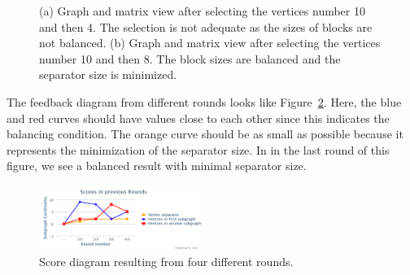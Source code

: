 \documentclass[12pt, twoside,a4paper,toc=bibliography]{scrbook}
\newcommand{\figref}[1]{Figure~\protect\ref{#1}}
\begin{document}
\begin{figure}
\centering
{}
\hfill
{}
\caption{
(a) Graph and matrix view after selecting the vertices number 10 and then 4.
The selection is not adequate as the sizes of blocks are not balanced.
(b) Graph and matrix view after selecting the vertices number 10 and then 8. The block sizes are balanced and the separator size is minimized.}
\label{selected_4_10_8_10}
\end{figure}

The feedback diagram from different rounds looks
like \figref{diagram}. Here, the blue and red curves should have
values close to each other since this indicates the balancing condition.
The orange curve should be as small as possible
because it represents the minimization of the separator size.
In in the last round of this figure, we see a balanced result with minimal separator size.
\begin{figure}
\centering
\includegraphics[width=0.47\textwidth]{diagram}
\caption{Score diagram resulting from four different rounds.}
\label{diagram}
\end{figure}
\end{document}
